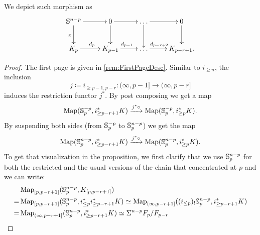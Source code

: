 We depict such morphism as
\begin{equation*}
    \xymatrix{
    \mathbb{S}^{n - p} \ar[d]_{x} \ar[r] & 0 \ar[r]\ar[d] & \dots \ar[r]\ar[d]& 0\ar[d]\\
    K_p \ar[r]^{d_p}& K_{p - 1} \ar[r]^{d_{p - 1}}& \dots \ar[r]^{d_{p - r + 2} \quad}& K_{p - r + 1}.
    }
\end{equation*}
\begin{proof}
    The first page is given in \cref{rem:FirstPageDesc}.
    Similar to $i_{\geq n}$, the inclusion
    \begin{equation*}
        j\coloneqq i_{\geq p-1, p-r} \colon (\infty, p-1] \to (\infty, p-r]
    \end{equation*}
    induces the restriction functor $j^*$.
    By post composing we get a map
    \begin{equation*}
        \operatorname{Map}(\mathbb{S}^{-p}_p, i_{\geq p-r+1}^* K) \xrightarrow{j^*\circ } \operatorname{Map}(\mathbb{S}^{-p}_p, i_{\geq p}^* K).
    \end{equation*}
    By suspending both sides (from $\mathbb{S}^{-p}_p$ to $\mathbb{S}^{n-p}_p$) we get the map
    \begin{equation}\label{eq:postJ}
        \operatorname{Map}(\mathbb{S}^{n-p}_p, i_{\geq p-r+1}^* K) \xrightarrow{j^*\circ } \operatorname{Map}(\mathbb{S}^{n-p}_p, i_{\geq p}^* K).
    \end{equation}
    To get that visualization in the proposition, we first clarify that we use $\mathbb{S}^{n-p}_p$ for both the restricted and the usual versions of the chain that concentrated at $p$ and we can write:
    \begin{align*}
          & \Map_{[p,p-r+1]}(\bbS^{n-p}_p, K_{[p,p-r+1]})                                                                                                 \\
        = & \Map_{[p,p-r+1]}(\bbS^{n-p}_p, i_{\leq p}^* i_{\geq p-r+1}^* K) \simeq \Map_{(\infty,p-r+1]}((i_{\leq p})_! \bbS^{n-p}_p, i_{\geq p-r+1}^* K) \\
        = & \Map_{(\infty,p-r+1]}(\bbS^{n-p}_p, i_{\geq p-r+1}^* K) \simeq \S^{n-p} F_p/F_{p-r}

\end{align*}
\end{proof}
